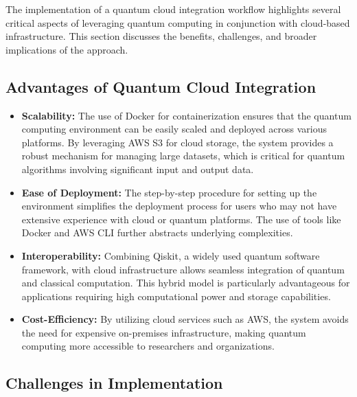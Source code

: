 \documentclass[conference]{IEEEtran}
\begin{document}
The implementation of a quantum cloud integration workflow highlights several critical aspects of leveraging quantum computing in conjunction with cloud-based infrastructure. This section discusses the benefits, challenges, and broader implications of the approach.

\subsection{Advantages of Quantum Cloud Integration}

\begin{itemize}
    \item \textbf{Scalability:} The use of Docker for containerization ensures that the quantum computing environment can be easily scaled and deployed across various platforms. By leveraging AWS S3 for cloud storage, the system provides a robust mechanism for managing large datasets, which is critical for quantum algorithms involving significant input and output data.

    \item \textbf{Ease of Deployment:} The step-by-step procedure for setting up the environment simplifies the deployment process for users who may not have extensive experience with cloud or quantum platforms. The use of tools like Docker and AWS CLI further abstracts underlying complexities.

    \item \textbf{Interoperability:} Combining Qiskit, a widely used quantum software framework, with cloud infrastructure allows seamless integration of quantum and classical computation. This hybrid model is particularly advantageous for applications requiring high computational power and storage capabilities.

    \item \textbf{Cost-Efficiency:} By utilizing cloud services such as AWS, the system avoids the need for expensive on-premises infrastructure, making quantum computing more accessible to researchers and organizations.
\end{itemize}

\subsection{Challenges in Implementation}
\end{document}
